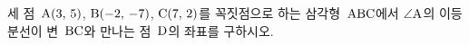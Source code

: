 세 점~$\mathrm{A}(3,\,5)$, $\mathrm{B}(-2,\,-7)$, $\mathrm{C}(7,\,2)$를 꼭짓점으로 하는 삼각형~$\mathrm{ABC}$에서 $\angle\mathrm{A}$의 이등분선이 변~$\mathrm{BC}$와 만나는 점~$\mathrm{D}$의 좌표를 구하시오.
